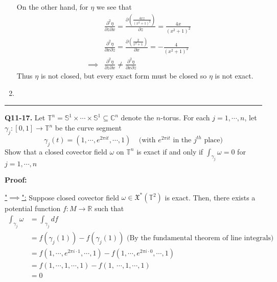 \documentclass{article}
\newcommand{\R}{\mathbb{R}}
\newcommand{\C}{\mathbb{C}}
\begin{document}
\begin{enumerate}[label=(\alph*)]
  \vskip 0.25cm
  On the other hand, for $\eta$ we see that 
  \begin{align*}
    &\frac{\partial^2 \eta}{\partial z \partial x} = \frac{\partial \left( \frac{4xz}{(x^2 + 1)^2} \right)}{\partial z} = \frac{4x}{(x^2 + 1)^2} \\
    &\frac{\partial^2 \eta}{\partial x \partial z} = \frac{\partial \left( \frac{2}{x^2 + 1} \right)}{\partial x} = -\frac{4}{(x^2 + 1)^2} \\
    \implies & \frac{\partial^2 \eta}{\partial z \partial x} \neq \frac{\partial^2 \eta}{\partial x \partial z}
  \end{align*}
  Thus $\eta$ is not closed, but every exact form must be closed so $\eta$ is not exact.


  \vskip 0.5cm
  \item 

\end{enumerate}


\vskip 0.5cm
\hrule 
\vskip 0.5cm



\textbf{Q11-17.} Let $\mathbb{T}^n = \mathbb{S}^1 \times \cdots \times \mathbb{S}^1 \subseteq \C^n$ denote the $n$-torus. For each $j = 1, \cdots, n$, let $\gamma_j : [0, 1] \rightarrow \mathbb{T}^n$ be the curve segment
\[ \gamma_j(t) = \left(1, \cdots, e^{2\pi i t}, \cdots, 1\right) \;\;\;\;\text{(with $e^{2\pi i t}$ in the $j^{th}$ place)} \] Show that a closed covector field $\omega$ on $\mathbb{T}^n$ is exact if and only if $\int_{{\gamma_j}} \omega = 0$ for $j = 1, \cdots, n$

\vskip 0.5cm
\textbf{Proof:}

\underline{"$\implies$":} Suppose closed covector field $\omega \in \mathfrak{X}^* \left(\mathbb{T}^2\right) $ is exact. Then, there exists a potential function $f : M \rightarrow \R$ such that 
\begin{align*}
  \int_{{\gamma_j}} \omega &= \int_{{\gamma_j}} df  \\
  &= f(\gamma_j(1)) - f(\gamma_j(1)) \text{    (By the fundamental theorem of line integrals)} \\
  &= f\left(1, \cdots, e^{2\pi i \cdot 1}, \cdots, 1\right) - f\left(1, \cdots, e^{2\pi i \cdot 0}, \cdots, 1\right) \\
  &= f\left(1, \cdots, 1, \cdots, 1\right) - f\left(1, \
  \cdots, 1, \cdots, 1\right) \\
  &= 0
\end{align*}
\end{document}

